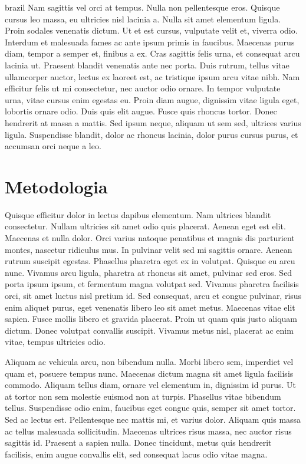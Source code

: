 \begin{otherlanguage*}{brazil}
        Nam sagittis vel orci at tempus. Nulla non pellentesque eros.
        Quisque cursus leo massa, eu ultricies nisl lacinia a. Nulla sit amet elementum ligula.
        Proin sodales venenatis dictum. Ut et est cursus, vulputate velit et, viverra odio. Interdum
        et malesuada fames ac ante ipsum primis in faucibus. Maecenas purus diam, tempor a semper
        et, finibus a ex. Cras sagittis felis urna, et consequat arcu lacinia ut. Praesent blandit
        venenatis ante nec porta. Duis rutrum, tellus vitae ullamcorper auctor, lectus ex laoreet
        est, ac tristique ipsum arcu vitae nibh. Nam efficitur felis ut mi consectetur, nec auctor
        odio ornare. In tempor vulputate urna, vitae cursus enim egestas eu. Proin diam augue,
        dignissim vitae ligula eget, lobortis ornare odio. Duis quis elit augue. Fusce quis rhoncus
        tortor. Donec hendrerit at massa a mattis. Sed ipsum neque, aliquam ut sem sed, ultrices
        varius ligula. Suspendisse blandit, dolor ac rhoncus lacinia, dolor purus cursus purus, et
        accumsan orci neque a leo.

        \section*{Metodologia}
        Quisque efficitur dolor in lectus dapibus elementum. Nam ultrices blandit consectetur.
        Nullam ultricies sit amet odio quis placerat. Aenean eget est elit. Maecenas et nulla dolor.
        Orci varius natoque penatibus et magnis dis parturient montes, nascetur ridiculus mus. In
        pulvinar velit sed mi sagittis ornare. Aenean rutrum suscipit egestas. Phasellus pharetra
        eget ex in volutpat. Quisque eu arcu nunc. Vivamus arcu ligula, pharetra at rhoncus sit
        amet, pulvinar sed eros. Sed porta ipsum ipsum, et fermentum magna volutpat sed. Vivamus
        pharetra facilisis orci, sit amet luctus nisl pretium id. Sed consequat, arcu et congue
        pulvinar, risus enim aliquet purus, eget venenatis libero leo sit amet metus. Maecenas vitae
        elit sapien. Fusce mollis libero et gravida placerat. Proin ut quam quis justo aliquam
        dictum. Donec volutpat convallis suscipit. Vivamus metus nisl, placerat ac enim vitae,
        tempus ultricies odio.

        Aliquam ac vehicula arcu, non bibendum nulla. Morbi libero sem,
        imperdiet vel quam et, posuere tempus nunc. Maecenas dictum magna sit amet ligula facilisis
        commodo. Aliquam tellus diam, ornare vel elementum in, dignissim id purus. Ut at tortor non
        sem molestie euismod non at turpis. Phasellus vitae bibendum tellus. Suspendisse odio enim,
        faucibus eget congue quis, semper sit amet tortor. Sed ac lectus est. Pellentesque nec
        mattis mi, et varius dolor. Aliquam quis massa ac tellus malesuada sollicitudin. Maecenas
        ultrices risus massa, nec auctor risus sagittis id. Praesent a sapien nulla. Donec
        tincidunt, metus quis hendrerit facilisis, enim augue convallis elit, sed consequat lacus
        odio vitae magna.


\end{otherlanguage*}
